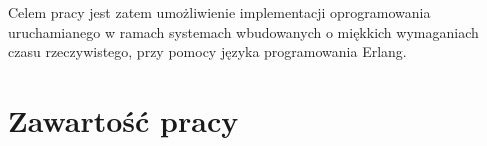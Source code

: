 Celem pracy jest zatem umożliwienie implementacji oprogramowania uruchamianego w ramach systemach wbudowanych o miękkich wymaganiach czasu rzeczywistego, przy pomocy języka programowania Erlang. 


\section{Zawartość pracy}
\label{sec:zawartoscPracy}
